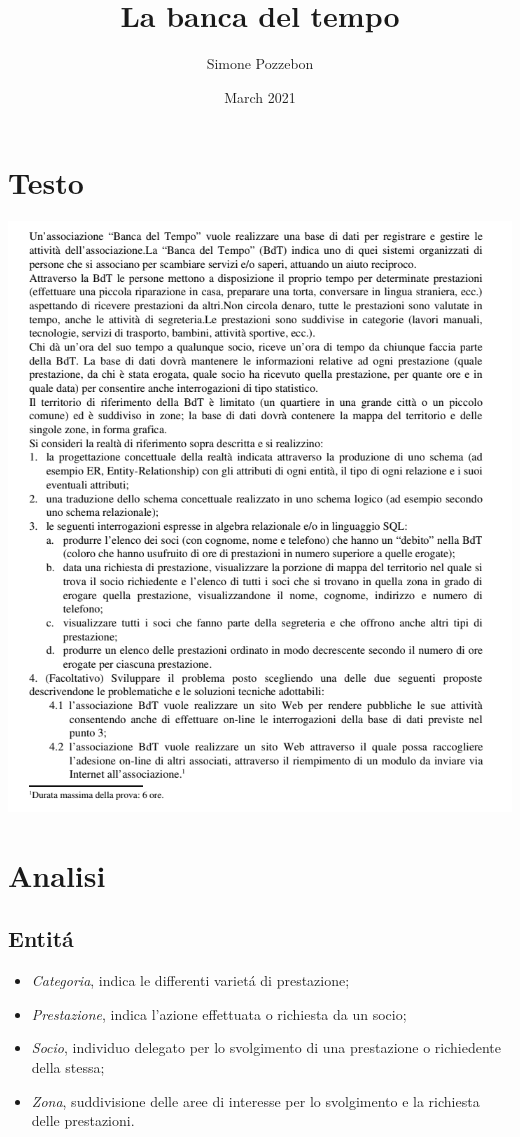﻿\documentclass[a4paper, 12pt]{article}
\title{La banca del tempo}
\author{Simone Pozzebon}
\date{March 2021}
\begin{document}
\maketitle
\newpage
\tableofcontents
\newpage

\section{Testo}
\begin{center}
\includegraphics[scale=0.5]{img/testo.png}
\end{center}
\newpage

\section{Analisi}

\subsection{Entit\'a}
\begin{itemize}
    \item \textit{Categoria}, indica le differenti variet\'a di prestazione;
    \item \textit{Prestazione}, indica l'azione effettuata o richiesta da un socio;
    \item \textit{Socio}, individuo delegato per lo svolgimento di una prestazione o richiedente della stessa;
    \item \textit{Zona}, suddivisione delle aree di interesse per lo svolgimento e la richiesta delle prestazioni.
\end{itemize}
\end{document}
